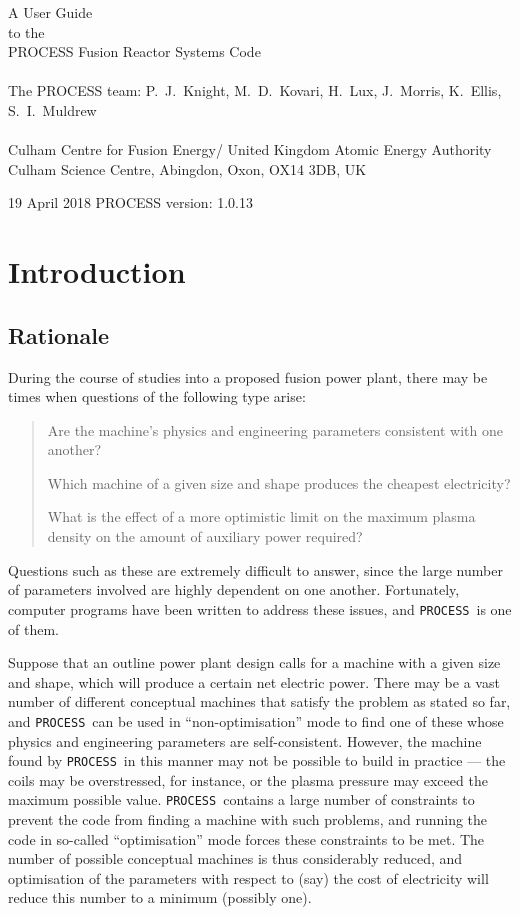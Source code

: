 \documentclass[11pt,a4paper]{report}
\newcommand{\process}{\mbox{\texttt{PROCESS}}}
\newcommand{\version}{
19 April 2018
\hfill
PROCESS version: 1.0.13
}
\newcommand{\setheader}[1]
 {\markright{\rlap{\lower0.8ex\hbox to\textwidth{\hrulefill}}{\bf#1}}}
\newcommand{\mychapter}[1]{\small\normalsize
 \setcounter{footnote}{0}
 \chapter{#1}
 \pagestyle{myheadings}
 \setheader{Chapter \thechapter\hspace{0.8em}#1}}
\begin{document}
\footnotesize
\hfill

\vspace*{4cm}
\begin{center}
\Huge A User Guide\\ to the \\ PROCESS Fusion Reactor Systems Code\\
~\\ \LARGE The PROCESS team: P.\ J.\ Knight, M.\ D.\ Kovari, H.\ Lux, J.\ Morris, K.\ Ellis, S.\ I.\ Muldrew\\
~\\ \Large Culham Centre for Fusion Energy/ United Kingdom Atomic Energy Authority\\
Culham Science Centre, Abingdon, Oxon, OX14 3DB, UK
\end{center}

\vfill
\footnotesize
\version
\normalsize

\tableofcontents

\listoffigures

\listoftables

\mychapter{Introduction}
\label{chap:intro}

\section{Rationale}

During the course of studies into a proposed fusion power plant, there may be
times when questions of the following type arise:
\begin{quote}
Are the machine's physics and engineering parameters consistent with one
another?

Which machine of a given size and shape produces the cheapest electricity?

What is the effect of a more optimistic limit on the maximum plasma density on
the amount of auxiliary power required?
\end{quote}

Questions such as these are extremely difficult to answer, since the large
number of parameters involved are highly dependent on one another.
Fortunately, computer programs have been written to address these issues, and
\process\ is one of them.

Suppose that an outline power plant design calls for a machine with a given
size and shape, which will produce a certain net electric power.  There may be
a vast number of different conceptual machines that satisfy the problem as
stated so far, and \process\ can be used in ``non-optimisation'' mode to find
one of these whose physics and engineering parameters are
self-consistent. However, the machine found by \process\ in this manner may
not be possible to build in practice --- the coils may be overstressed, for
instance, or the plasma pressure may exceed the maximum possible
value. \process\ contains a large number of constraints to prevent the code
from finding a machine with such problems, and running the code in so-called
``optimisation'' mode forces these constraints to be met. The number of
possible conceptual machines is thus considerably reduced, and optimisation of
the parameters with respect to (say) the cost of electricity will reduce this
number to a minimum (possibly one).
\end{document}

